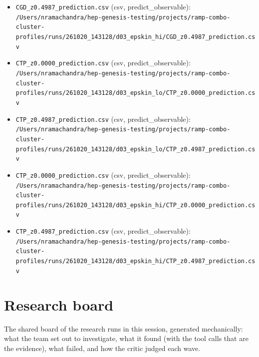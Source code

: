 \documentclass[11pt,a4paper]{article}
\begin{document}
\begin{itemize}
  \item \texttt{CGD\_\allowbreak{}z0.4987\_\allowbreak{}prediction.csv} (csv, predict\_observable): \texttt{/\allowbreak{}Users/\allowbreak{}nramachandra/\allowbreak{}hep-genesis-testing/\allowbreak{}projects/\allowbreak{}ramp-combo-cluster-profiles/\allowbreak{}runs/\allowbreak{}261020\_\allowbreak{}143128/\allowbreak{}d03\_\allowbreak{}epskin\_\allowbreak{}hi/\allowbreak{}CGD\_\allowbreak{}z0.4987\_\allowbreak{}prediction.csv}
  \item \texttt{CTP\_\allowbreak{}z0.0000\_\allowbreak{}prediction.csv} (csv, predict\_observable): \texttt{/\allowbreak{}Users/\allowbreak{}nramachandra/\allowbreak{}hep-genesis-testing/\allowbreak{}projects/\allowbreak{}ramp-combo-cluster-profiles/\allowbreak{}runs/\allowbreak{}261020\_\allowbreak{}143128/\allowbreak{}d03\_\allowbreak{}epskin\_\allowbreak{}lo/\allowbreak{}CTP\_\allowbreak{}z0.0000\_\allowbreak{}prediction.csv}
  \item \texttt{CTP\_\allowbreak{}z0.4987\_\allowbreak{}prediction.csv} (csv, predict\_observable): \texttt{/\allowbreak{}Users/\allowbreak{}nramachandra/\allowbreak{}hep-genesis-testing/\allowbreak{}projects/\allowbreak{}ramp-combo-cluster-profiles/\allowbreak{}runs/\allowbreak{}261020\_\allowbreak{}143128/\allowbreak{}d03\_\allowbreak{}epskin\_\allowbreak{}lo/\allowbreak{}CTP\_\allowbreak{}z0.4987\_\allowbreak{}prediction.csv}
  \item \texttt{CTP\_\allowbreak{}z0.0000\_\allowbreak{}prediction.csv} (csv, predict\_observable): \texttt{/\allowbreak{}Users/\allowbreak{}nramachandra/\allowbreak{}hep-genesis-testing/\allowbreak{}projects/\allowbreak{}ramp-combo-cluster-profiles/\allowbreak{}runs/\allowbreak{}261020\_\allowbreak{}143128/\allowbreak{}d03\_\allowbreak{}epskin\_\allowbreak{}hi/\allowbreak{}CTP\_\allowbreak{}z0.0000\_\allowbreak{}prediction.csv}
  \item \texttt{CTP\_\allowbreak{}z0.4987\_\allowbreak{}prediction.csv} (csv, predict\_observable): \texttt{/\allowbreak{}Users/\allowbreak{}nramachandra/\allowbreak{}hep-genesis-testing/\allowbreak{}projects/\allowbreak{}ramp-combo-cluster-profiles/\allowbreak{}runs/\allowbreak{}261020\_\allowbreak{}143128/\allowbreak{}d03\_\allowbreak{}epskin\_\allowbreak{}hi/\allowbreak{}CTP\_\allowbreak{}z0.4987\_\allowbreak{}prediction.csv}
\end{itemize}

\section{Research board}
\label{app:board}
The shared board of the research runs in this session, generated mechanically: what the team set out to investigate, what it found (with the tool calls that are the evidence), what failed, and how the critic judged each wave.
\end{document}
